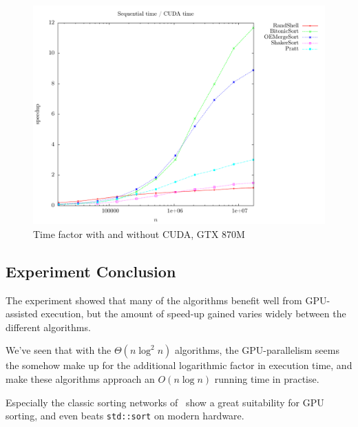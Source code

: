 \begin{figure}
\center
\includegraphics[width=\textwidth]{graphs/CUDAHueg/timediff.pdf}
\caption{Time factor with and without CUDA, GTX 870M}
\label{fig:CUDAGTX:timediff}
\end{figure}

\subsection{Experiment Conclusion}

The experiment showed that many of the algorithms benefit well from GPU-assisted execution, but the amount of speed-up gained varies widely between the different algorithms.

We've seen that with the $\Theta(n \log^2 n)$ algorithms, the GPU-parallelism seems the somehow make up for the additional logarithmic factor in execution time, and make these algorithms approach an $O(n \log n)$ running time in practise.

Especially the classic sorting networks of~ show a great suitability for GPU sorting, and even beats \texttt{std::sort} on modern hardware.